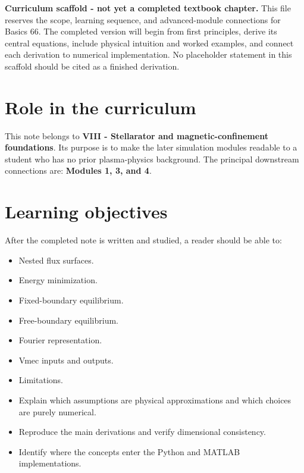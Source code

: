 \documentclass[11pt]{article}
\begin{document}

\begin{overviewbox}
\textbf{Curriculum scaffold - not yet a completed textbook chapter.} This file reserves the scope, learning sequence, and advanced-module connections for Basics 66. The completed version will begin from first principles, derive its central equations, include physical intuition and worked examples, and connect each derivation to numerical implementation. No placeholder statement in this scaffold should be cited as a finished derivation.
\end{overviewbox}

\ProjectTOC

\section{Role in the curriculum}
This note belongs to \textbf{VIII - Stellarator and magnetic-confinement foundations}. Its purpose is to make the later simulation modules readable to a student who has no prior plasma-physics background. The principal downstream connections are: \textbf{Modules 1, 3, and 4}.

\section{Learning objectives}
After the completed note is written and studied, a reader should be able to:
\begin{itemize}[leftmargin=1.6em]
\item Nested flux surfaces.
\item Energy minimization.
\item Fixed-boundary equilibrium.
\item Free-boundary equilibrium.
\item Fourier representation.
\item Vmec inputs and outputs.
\item Limitations.
\item Explain which assumptions are physical approximations and which choices are purely numerical.
\item Reproduce the main derivations and verify dimensional consistency.
\item Identify where the concepts enter the Python and MATLAB implementations.
\end{itemize}
\end{document}
